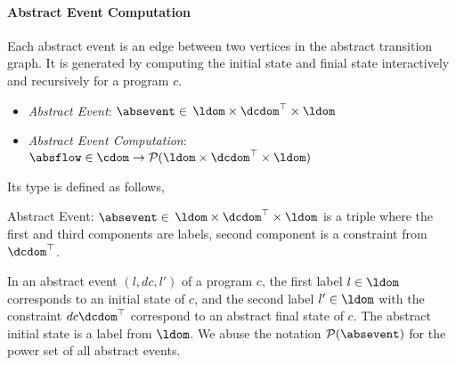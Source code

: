  \paragraph{Abstract Event Computation} Each abstract event is an edge between two vertices in the abstract transition graph.
 It is generated by computing the initial state and finial state interactively and recursively for a program $c$.
 
 \begin{itemize}
  \item \emph{Abstract Event}: 
  $\absevent \in $
  $\ldom \times \dcdom^{\top} \times \ldom$
  \item \emph{Abstract Event Computation}: $\absflow \in \cdom \to \mathcal{P}( \ldom \times \dcdom^{\top} \times \ldom )$
 \end{itemize}
 Its type is defined as follows,
 \begin{defn}
   \label{def:abs_event}
   Abstract Event: 
   $\absevent \in $
   $\ldom \times \dcdom^{\top} \times \ldom$
   is a 
   triple where the first and third components are labels,
   second component is a constraint from $\dcdom^{\top}$.
   \end{defn}
   In an abstract event $(l, dc, l')$ of a program $c$, 
   the first label $l \in \ldom$ corresponds to an initial state of $c$, and 
   the second label $l' \in \ldom$ with the constraint $dc\dcdom^{\top}$ correspond to an abstract final state of $c$.
  The abstract initial state is a label from $\ldom$.
We abuse the notation $\mathcal{P}(\absevent)$ for the power set of all abstract events.

